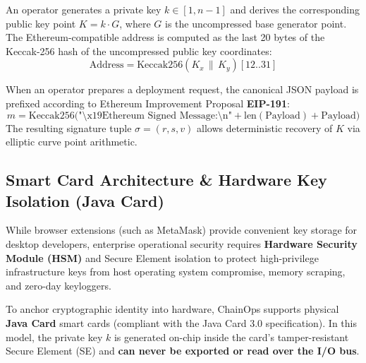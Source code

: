 \documentclass[a4paper,12pt]{article}
\begin{document}
An operator generates a private key $k \in [1, n-1]$ and derives the corresponding public key point $K = k \cdot G$, where $G$ is the uncompressed base generator point. The Ethereum-compatible address is computed as the last 20 bytes of the Keccak-256 hash of the uncompressed public key coordinates:
\begin{equation}
\text{Address} = \text{Keccak256}(K_x \,\|\, K_y)[12..31]
\end{equation}

When an operator prepares a deployment request, the canonical JSON payload is prefixed according to Ethereum Improvement Proposal \textbf{EIP-191}:
\begin{equation}
m = \text{Keccak256}\Big(\text{"\textbackslash x19Ethereum Signed Message:\textbackslash n"} + \text{len}(\text{Payload}) + \text{Payload}\Big)
\end{equation}
The resulting signature tuple $\sigma = (r, s, v)$ allows deterministic recovery of $K$ via elliptic curve point arithmetic.

\subsection{Smart Card Architecture \& Hardware Key Isolation (Java Card)}

While browser extensions (such as MetaMask) provide convenient key storage for desktop developers, enterprise operational security requires \textbf{Hardware Security Module (HSM)} and Secure Element isolation to protect high-privilege infrastructure keys from host operating system compromise, memory scraping, and zero-day keyloggers.

\begin{calloutbox}
To anchor cryptographic identity into hardware, ChainOps supports physical \textbf{Java Card} smart cards (compliant with the Java Card 3.0 specification). In this model, the private key $k$ is generated on-chip inside the card's tamper-resistant Secure Element (SE) and \textbf{can never be exported or read over the I/O bus}.
\end{calloutbox}
\end{document}
